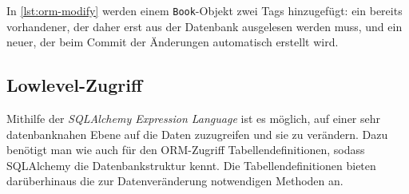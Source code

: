 In \autoref{lst:orm-modify} werden einem \texttt{Book}-Objekt zwei Tags
hinzugefügt: ein bereits vorhandener, der daher erst aus der Datenbank
ausgelesen werden muss, und ein neuer, der beim Commit der Änderungen
automatisch erstellt wird.



\subsection{Lowlevel-Zugriff}

Mithilfe der \emph{SQLAlchemy Expression Language} ist es möglich, auf einer
sehr datenbanknahen Ebene auf die Daten zuzugreifen und sie zu verändern. Dazu
benötigt man wie auch für den ORM-Zugriff Tabellendefinitionen, sodass
SQLAlchemy die Datenbankstruktur kennt.
Die Tabellendefinitionen bieten darüberhinaus die zur Datenveränderung
notwendigen Methoden an.

